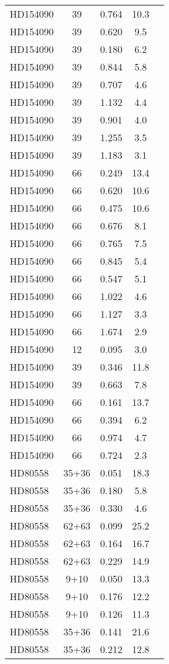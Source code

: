 \begin{table*}
\begin{tabular}{l c c c c}
HD154090 & 39 & 0.764 & 10.3\\ 
HD154090 & 39 & 0.620 & 9.5\\ 
HD154090 & 39 & 0.180 & 6.2\\ 
HD154090 & 39 & 0.844 & 5.8\\ 
HD154090 & 39 & 0.707 & 4.6\\ 
HD154090 & 39 & 1.132 & 4.4\\ 
HD154090 & 39 & 0.901 & 4.0\\ 
HD154090 & 39 & 1.255 & 3.5\\ 
HD154090 & 39 & 1.183 & 3.1\\ 
HD154090 & 66 & 0.249 & 13.4\\ 
HD154090 & 66 & 0.620 & 10.6\\ 
HD154090 & 66 & 0.475 & 10.6\\ 
HD154090 & 66 & 0.676 & 8.1\\ 
HD154090 & 66 & 0.765 & 7.5\\ 
HD154090 & 66 & 0.845 & 5.4\\ 
HD154090 & 66 & 0.547 & 5.1\\ 
HD154090 & 66 & 1.022 & 4.6\\ 
HD154090 & 66 & 1.127 & 3.3\\ 
HD154090 & 66 & 1.674 & 2.9\\ 
HD154090 & 12 & 0.095 & 3.0\\ 
HD154090 & 39 & 0.346 & 11.8\\ 
HD154090 & 39 & 0.663 & 7.8\\ 
HD154090 & 66 & 0.161 & 13.7\\ 
HD154090 & 66 & 0.394 & 6.2\\ 
HD154090 & 66 & 0.974 & 4.7\\ 
HD154090 & 66 & 0.724 & 2.3\\ 
\hline
HD80558 & 35+36 & 0.051 & 18.3\\ 
HD80558 & 35+36 & 0.180 & 5.8\\ 
HD80558 & 35+36 & 0.330 & 4.6\\ 
HD80558 & 62+63 & 0.099 & 25.2\\ 
HD80558 & 62+63 & 0.164 & 16.7\\ 
HD80558 & 62+63 & 0.229 & 14.9\\ 
HD80558 & 9+10 & 0.050 & 13.3\\ 
HD80558 & 9+10 & 0.176 & 12.2\\ 
HD80558 & 9+10 & 0.126 & 11.3\\ 
HD80558 & 35+36 & 0.141 & 21.6\\ 
HD80558 & 35+36 & 0.212 & 12.8\\ 

\end{tabular}
\end{table*}
